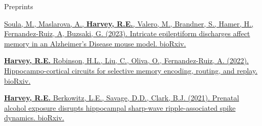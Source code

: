 


\begin{cventries}

\cventry
    {Preprints} %
    {} %
    {} %
    {} %
    {
      \begin{cvitems} %
      \setlength\itemsep{0.5em}
        \item {\href{https://doi.org/10.1101/2023.02.15.528683}{Soula, M., Maslarova, A., \textbf{Harvey, R.E.}, Valero, M., Brandner, S., Hamer, H., Fernandez-Ruiz, A, Buzsaki, G. (2023). Intricate epileptiform discharges affect memory in an Alzheimer's Disease mouse model. bioRxiv.}}
        \item {\href{https://doi.org/10.1101/2022.09.25.509420}{\textbf{Harvey, R.E.} Robinson, H.L., Liu, C., Oliva, O., Fernandez-Ruiz, A. (2022). Hippocampo-cortical circuits for selective memory encoding, routing, and replay. bioRxiv.}}
        \item {\href{https://doi.org/10.1101/2021.06.29.450435}{\textbf{Harvey, R.E.} Berkowitz, L.E., Savage, D.D., Clark, B.J. (2021). Prenatal alcohol exposure disrupts hippocampal sharp-wave ripple-associated spike dynamics. bioRxiv.}}
      \end{cvitems}
    }
    

\end{cventries}
